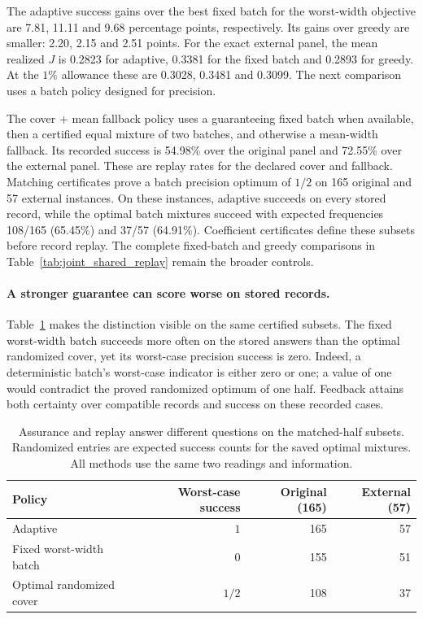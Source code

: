 \documentclass[12pt]{article}
\begin{document}
The adaptive success gains over the best fixed batch for the worst-width objective are
7.81, 11.11 and 9.68 percentage points, respectively. Its gains over greedy
are smaller: 2.20, 2.15 and 2.51 points. For the exact external panel, the
mean realized $J$ is 0.2823 for adaptive, 0.3381 for the fixed batch and
0.2893 for greedy. At the $1\%$ allowance these are 0.3028, 0.3481 and
0.3099. The next comparison uses a batch policy designed for precision.

The cover + mean fallback policy uses a guaranteeing fixed batch when
available, then a certified equal mixture of two batches, and otherwise a
mean-width fallback.
Its recorded success is 54.98\% over the original panel and 72.55\% over the
external panel. These are replay rates for the declared cover and fallback.
Matching certificates prove a batch precision optimum of
$1/2$ on 165 original and 57 external instances. On these instances, adaptive
succeeds on every stored record, while the optimal batch mixtures succeed
with expected frequencies 108/165 (65.45\%) and 37/57 (64.91\%). Coefficient
certificates define these subsets before record replay. The complete fixed-batch and greedy
comparisons in Table~\ref{tab:joint_shared_replay} remain the broader controls.

\paragraph{A stronger guarantee can score worse on stored records.}
Table~\ref{tab:guarantee-recorded-tradeoff} makes the distinction visible on
the same certified subsets. The fixed worst-width batch succeeds more often
on the stored answers than the optimal randomized cover, yet its worst-case
precision success is zero. Indeed, a deterministic batch's worst-case
indicator is either zero or one; a value of one would contradict the
proved randomized optimum of one half. Feedback attains both certainty
over compatible records and success on these recorded cases.

\begin{table}[htbp]\centering\small
\caption{Assurance and replay answer different questions on the matched-half
subsets. Randomized entries are expected success counts for the saved
optimal mixtures. All methods use the same two readings and information.}
\label{tab:guarantee-recorded-tradeoff}
\begin{tabular}{lrrr}\toprule
Policy & Worst-case success & Original (165) & External (57)\\\midrule
Adaptive & $1$ & 165 & 57\\
Fixed worst-width batch & $0$ & 155 & 51\\
Optimal randomized cover & $1/2$ & 108 & 37\\
\bottomrule\end{tabular}\end{table}
\end{document}
